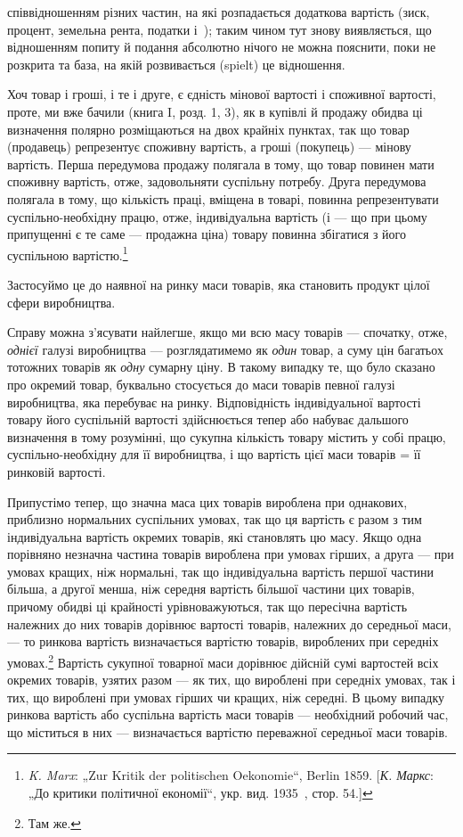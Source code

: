 \parcont{}  %
співвідношенням різних частин, на які розпадається додаткова
вартість (зиск, процент, земельна рента, податки і~); таким
чином тут знову виявляється, що відношенням попиту й подання
абсолютно нічого не можна пояснити, поки не розкрита та база,
на якій розвивається (spielt) це відношення.

Хоч товар і гроші, і те і друге, є єдність мінової вартості
і споживної вартості, проте, ми вже бачили (книга I, розд. 1, 3),
як в купівлі й продажу обидва ці визначення полярно розміщаються на двох крайніх пунктах, так що
товар (продавець)
репрезентує споживну вартість, а гроші (покупець) — мінову вартість. Перша передумова продажу
полягала в тому, що товар
повинен мати споживну вартість, отже, задовольняти суспільну
потребу. Друга передумова полягала в тому, що кількість
праці, вміщена в товарі, повинна репрезентувати суспільно-необхідну працю, отже, індивідуальна
вартість (і — що при цьому
припущенні є те саме — продажна ціна) товару повинна збігатися з його суспільною вартістю.\footnote{
\emph{K. Marx}: „Zur Kritik der politischen Oekonomie“, Berlin 1859. [\emph{К. Маркс}:
„До критики політичної економії“, укр. вид. 1935~, стор. 54.]
}

Застосуймо це до наявної на ринку маси товарів, яка становить продукт цілої сфери виробництва.

Справу можна з’ясувати найлегше, якщо ми всю масу товарів — спочатку, отже, \emph{однієї} галузі
виробництва — розглядатимемо
як \emph{один} товар, а суму цін багатьох тотожних товарів як \emph{одну}
сумарну ціну. В такому випадку те, що було сказано про окремий товар, буквально стосується до маси
товарів певної галузі
виробництва, яка перебуває на ринку. Відповідність індивідуальної вартості товару його суспільній
вартості здійснюється тепер
або набуває дальшого визначення в тому розумінні, що сукупна
кількість товару містить у собі працю, суспільно-необхідну для
її виробництва, і що вартість цієї маси товарів = її ринковій
вартості.

Припустімо тепер, що значна маса цих товарів вироблена
при однакових, приблизно нормальних суспільних умовах, так
що ця вартість є разом з тим індивідуальна вартість окремих
товарів, які становлять цю масу. Якщо одна порівняно незначна
частина товарів вироблена при умовах гірших, а друга — при умовах
кращих, ніж нормальні, так що індивідуальна вартість першої
частини більша, а другої менша, ніж середня вартість більшої частини цих товарів, причому обидві ці
крайності урівноважуються,
так що пересічна вартість належних до них товарів дорівнює
вартості товарів, належних до середньої маси, — то ринкова вартість визначається вартістю товарів,
вироблених при середніх
умовах.\footnote{
Там же.
} Вартість сукупної товарної маси дорівнює дійсній сумі
вартостей всіх окремих товарів, узятих разом — як тих, що вироблені при середніх умовах, так і тих,
що вироблені при умовах
гірших чи кращих, ніж середні. В цьому випадку ринкова
вартість або суспільна вартість маси товарів — необхідний робочий час, що міститься в них —
визначається вартістю переважної середньої маси товарів.

